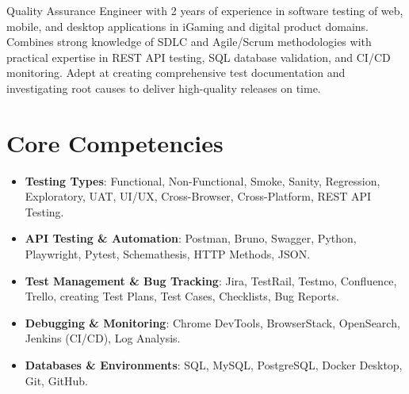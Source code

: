 \documentclass[11pt,a4paper,sans]{moderncv}
\begin{document}
\makecvtitle


\vspace{6pt}
\small{Quality Assurance Engineer with 2 years of experience in software testing of web, mobile, and desktop applications in iGaming and digital product domains. Combines strong knowledge of SDLC and Agile/Scrum methodologies with practical expertise in REST API testing, SQL database validation, and CI/CD monitoring. Adept at creating comprehensive test documentation and investigating root causes to deliver high-quality releases on time.}


\section{Core Competencies}
\vspace{1pt}
\begin{itemize}

\item \textbf{Testing Types}: Functional, Non-Functional, Smoke, Sanity, Regression, Exploratory, UAT, UI/UX, Cross-Browser, Cross-Platform, REST API Testing.

\item \textbf{API Testing \& Automation}: Postman, Bruno, Swagger, Python, Playwright, Pytest, Schemathesis, HTTP Methods, JSON.

\item \textbf{Test Management \& Bug Tracking}: Jira, TestRail, Testmo, Confluence, Trello, creating Test Plans, Test Cases, Checklists, Bug Reports.

\item \textbf{Debugging \& Monitoring}: Chrome DevTools, BrowserStack, OpenSearch, Jenkins (CI/CD), Log Analysis.

\item \textbf{Databases \& Environments}: SQL, MySQL, PostgreSQL, Docker Desktop, Git, GitHub.

\end{itemize}

\end{document}
